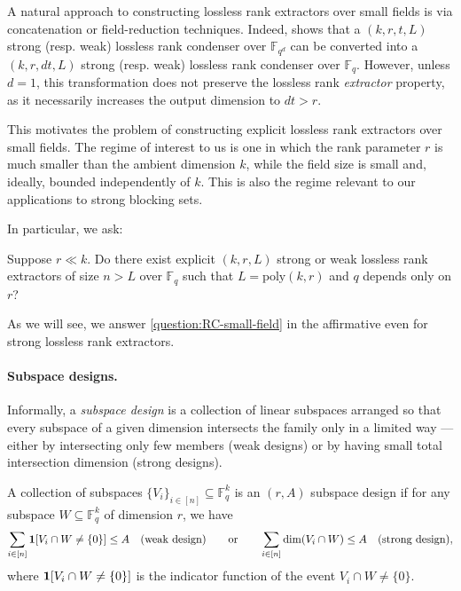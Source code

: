 \documentclass[11pt]{article}
\newif\ifdraft
\newcommand{\ZZnote}[1]{\ifdraft\textcolor{red}{[Zihan: #1]}\fi}
\newcommand{\F}{\mathbb{F}}
\newcommand{\poly}{\mathrm{poly}}
\begin{document}
A natural approach to constructing lossless rank extractors over small fields is via concatenation or field-reduction techniques. Indeed, \cite[Proposition~8.5]{FG15} shows that a $(k,r,t,L)$ strong (resp. weak) lossless rank condenser over $\F_{q^d}$ can be converted into a $(k,r,dt,L)$ strong (resp. weak) lossless rank condenser over $\F_q$. However, unless $d=1$, this transformation does not preserve the lossless rank \emph{extractor} property, as it necessarily increases the output dimension to $dt > r$.

This motivates the problem of constructing explicit lossless rank extractors over small fields. The regime of interest to us is one in which the rank parameter $r$ is much smaller than the ambient dimension $k$, while the field size is small and, ideally, bounded independently of $k$. This is also the regime relevant to our applications to strong blocking sets.

In particular, we ask:

\begin{question}\label{question:RC-small-field}
Suppose $r \ll k$. Do there exist explicit $(k,r,L)$ strong or weak lossless rank extractors of size $n > L$ over $\F_q$ such that $L=\poly(k,r)$ and $q$ depends only on $r$?
\end{question}

As we will see, we answer \cref{question:RC-small-field} in the affirmative even for strong lossless rank extractors.

\paragraph{Subspace designs.}
Informally, a \emph{subspace design} is a collection of linear subspaces arranged so that every subspace of a given dimension intersects the family only in a limited way --- either by intersecting only few members (weak designs) or by having small total intersection dimension (strong designs).

\begin{definition}
    A collection of subspaces $\{V_i\}_{i\in[n]}\subseteq\mathbb{F}_q^k$ is an $(r,A)$ subspace design if for any subspace $W\subseteq\mathbb{F}_q^k$ of dimension $r$, we have
    \[\sum_{\substack{i\in [n]}}{\bf 1}[V_i\cap W\neq \{0\}]\leq A\quad \text{(weak design)}\qquad \text{or}\qquad\sum_{\substack{i\in [n]}}\dim(V_i\cap W)\leq A \quad \text{(strong design)},\]
where ${\bf 1}[V_i\cap W\neq \{0\}]$ is the indicator function of the event $V_i\cap W\neq \{0\}$.
\end{definition}
\end{document}
